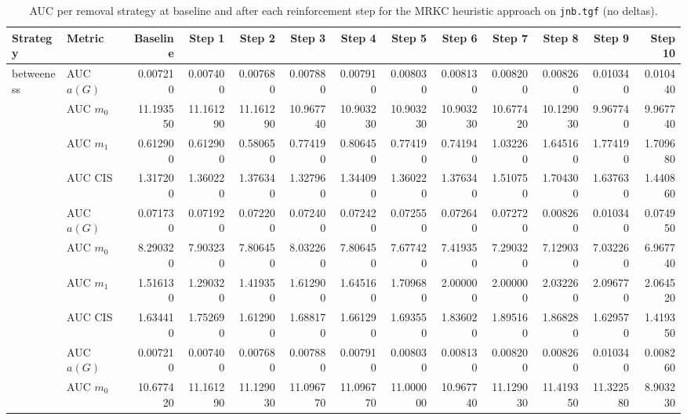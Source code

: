 \begin{table}[htbp]
  \centering
  \caption{AUC per removal strategy at baseline and after each reinforcement step for the MRKC heuristic approach on \texttt{jnb.tgf} (no deltas).}
  \label{tab:jnb-mrkc_heuristic-auc}
\setlength{\tabcolsep}{2.5pt}
  \begin{tabular}{llrrrrrrrrrrr}
    \toprule
    \textbf{Strategy} & \textbf{Metric} & \textbf{Baseline} & \textbf{Step 1} & \textbf{Step 2} & \textbf{Step 3} & \textbf{Step 4} & \textbf{Step 5} & \textbf{Step 6} & \textbf{Step 7} & \textbf{Step 8} & \textbf{Step 9} & \textbf{Step 10} \\
    \midrule
    \multirow{4}{*}{betweeness} & AUC $a(G)$ & 0.007210 & 0.007400 & 0.007680 & 0.007880 & 0.007910 & 0.008030 & 0.008130 & 0.008200 & 0.008260 & 0.010340 & 0.010440 \\
    & AUC $m_0$ & 11.193550 & 11.161290 & 11.161290 & 10.967740 & 10.903230 & 10.903230 & 10.903230 & 10.677420 & 10.129030 & 9.967740 & 9.967740 \\
    & AUC $m_1$ & 0.612900 & 0.612900 & 0.580650 & 0.774190 & 0.806450 & 0.774190 & 0.741940 & 1.032260 & 1.645160 & 1.774190 & 1.709680 \\
    & AUC CIS & 1.317200 & 1.360220 & 1.376340 & 1.327960 & 1.344090 & 1.360220 & 1.376340 & 1.510750 & 1.704300 & 1.637630 & 1.440860 \\
    \addlinespace
    \multirow{4}{*}{closeness} & AUC $a(G)$ & 0.071730 & 0.071920 & 0.072200 & 0.072400 & 0.072420 & 0.072550 & 0.072640 & 0.072720 & 0.008260 & 0.010340 & 0.074950 \\
    & AUC $m_0$ & 8.290320 & 7.903230 & 7.806450 & 8.032260 & 7.806450 & 7.677420 & 7.419350 & 7.290320 & 7.129030 & 7.032260 & 6.967740 \\
    & AUC $m_1$ & 1.516130 & 1.290320 & 1.419350 & 1.612900 & 1.645160 & 1.709680 & 2.000000 & 2.000000 & 2.032260 & 2.096770 & 2.064520 \\
    & AUC CIS & 1.634410 & 1.752690 & 1.612900 & 1.688170 & 1.661290 & 1.693550 & 1.836020 & 1.895160 & 1.868280 & 1.629570 & 1.419350 \\
    \addlinespace
    \multirow{4}{*}{core influence} & AUC $a(G)$ & 0.007210 & 0.007400 & 0.007680 & 0.007880 & 0.007910 & 0.008030 & 0.008130 & 0.008200 & 0.008260 & 0.010340 & 0.008260 \\
    & AUC $m_0$ & 10.677420 & 11.161290 & 11.129030 & 11.096770 & 11.096770 & 11.000000 & 10.967740 & 11.129030 & 11.419350 & 11.322580 & 8.903230 \\

\end{tabular}
\end{table}
